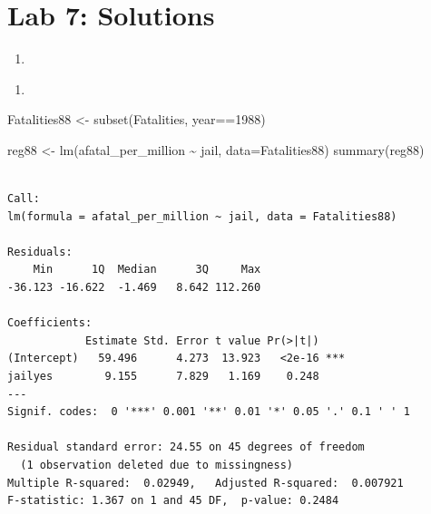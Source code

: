 \documentclass[
  letterpaper,
  DIV=11,
  numbers=noendperiod]{scrreprt}
\newenvironment{Shaded}{\begin{snugshade}}{\end{snugshade}}
\newcommand{\AttributeTok}[1]{\textcolor[rgb]{0.40,0.45,0.13}{#1}}
\newcommand{\DecValTok}[1]{\textcolor[rgb]{0.68,0.00,0.00}{#1}}
\newcommand{\FunctionTok}[1]{\textcolor[rgb]{0.28,0.35,0.67}{#1}}
\newcommand{\NormalTok}[1]{\textcolor[rgb]{0.00,0.23,0.31}{#1}}
\newcommand{\OtherTok}[1]{\textcolor[rgb]{0.00,0.23,0.31}{#1}}
\newcommand{\SpecialCharTok}[1]{\textcolor[rgb]{0.37,0.37,0.37}{#1}}
\newcommand{\StringTok}[1]{\textcolor[rgb]{0.13,0.47,0.30}{#1}}
\providecommand{\tightlist}{%
  \setlength{\itemsep}{0pt}\setlength{\parskip}{0pt}}\usepackage{longtable,booktabs,array}
\begin{document}
\section{Lab 7: Solutions}\label{lab-7-solutions}

\begin{enumerate}
\def\labelenumi{\arabic{enumi}.}
\tightlist
\item
\end{enumerate}

\begin{Shaded}
\end{Shaded}

\begin{enumerate}
\def\labelenumi{\arabic{enumi}.}
\setcounter{enumi}{1}
\tightlist
\item
\end{enumerate}

\begin{Shaded}
\begin{Highlighting}[]
\NormalTok{Fatalities88 }\OtherTok{\textless{}{-}} \FunctionTok{subset}\NormalTok{(Fatalities, year}\SpecialCharTok{==}\DecValTok{1988}\NormalTok{)}

\NormalTok{reg88 }\OtherTok{\textless{}{-}} \FunctionTok{lm}\NormalTok{(afatal\_per\_million }\SpecialCharTok{\textasciitilde{}}\NormalTok{ jail, }\AttributeTok{data=}\NormalTok{Fatalities88)}
\FunctionTok{summary}\NormalTok{(reg88)}
\end{Highlighting}
\end{Shaded}

\begin{verbatim}

Call:
lm(formula = afatal_per_million ~ jail, data = Fatalities88)

Residuals:
    Min      1Q  Median      3Q     Max 
-36.123 -16.622  -1.469   8.642 112.260 

Coefficients:
            Estimate Std. Error t value Pr(>|t|)    
(Intercept)   59.496      4.273  13.923   <2e-16 ***
jailyes        9.155      7.829   1.169    0.248    
---
Signif. codes:  0 '***' 0.001 '**' 0.01 '*' 0.05 '.' 0.1 ' ' 1

Residual standard error: 24.55 on 45 degrees of freedom
  (1 observation deleted due to missingness)
Multiple R-squared:  0.02949,   Adjusted R-squared:  0.007921 
F-statistic: 1.367 on 1 and 45 DF,  p-value: 0.2484
\end{verbatim}
\end{document}
